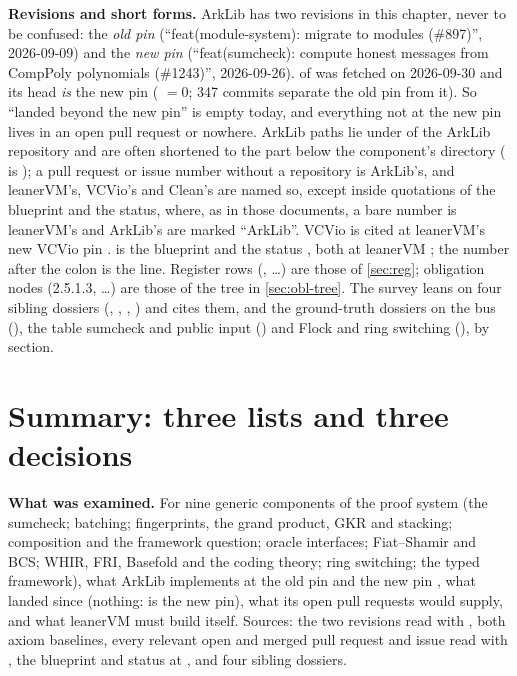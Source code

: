 \begin{sloppypar}
\textbf{Revisions and short forms.} ArkLib has two revisions in this chapter, never to be
confused: the \emph{old pin}  (``feat(module-system): migrate to modules
(\#897)'', 2026-09-09) and the \emph{new pin}  (``feat(sumcheck): compute honest
messages from CompPoly polynomials (\#1243)'', 2026-09-26).  of
 was fetched on 2026-09-30 and its head \emph{is} the new pin
( $= 0$; 347 commits separate the old pin from
it). So ``landed beyond the new pin'' is empty today, and everything not at the new pin lives in
an open pull request or nowhere. ArkLib paths lie under  of the ArkLib repository
and are often shortened to the part below the component's directory (
is ); a pull request or issue number without a repository is ArkLib's, and leanerVM's, VCVio's and
Clean's are named so, except inside quotations of the blueprint and the status, where, as in those
documents, a bare number is leanerVM's and ArkLib's are marked ``ArkLib''. VCVio is cited at leanerVM's new VCVio pin .  is
the blueprint  and  the status
, both at leanerVM ; the number after the
colon is the line. Register rows (, \ldots) are those of \cref{sec:reg}; obligation
nodes (2.5.1.3, \ldots) are those of the tree in \cref{sec:obl-tree}. The survey leans on four
sibling dossiers (, , ,
) and cites them, and the ground-truth dossiers on the bus
(), the table sumcheck and public input () and Flock and
ring switching (), by section.
\end{sloppypar}

\section{Summary: three lists and three decisions}\label{sec:ark-summary}

\textbf{What was examined.} For nine generic components of the proof system (the sumcheck;
batching; fingerprints, the grand product, GKR and stacking; composition and the framework
question; oracle interfaces; Fiat--Shamir and BCS; WHIR, FRI, Basefold and the coding theory;
ring switching; the typed  framework), what ArkLib implements at the old pin
 and the new pin , what landed since (nothing: 
is the new pin), what its open pull requests would supply, and what leanerVM must build itself.
Sources: the two revisions read with , both axiom baselines, every relevant open
and merged pull request and issue read with , the blueprint and status at
, and four sibling dossiers.

